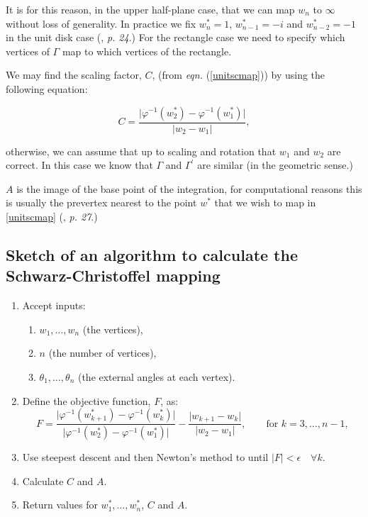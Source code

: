 \documentclass[a4paper,10pt]{amsart}
\newcommand{\sch}{Schwarz-Christoffel }
\newcommand{\eqn}[1]{\emph{eqn.} (\ref{#1})}
\newcommand{\phiinv}{\phi^{-1}}
\renewcommand{\phi}{\varphi}
\begin{document}
It is for this reason, in the upper half-plane case, that we can map $w_n$ to $\infty$ without loss of generality. In practice we fix $w^*_n=1$, $w^*_{n-1}=-i$ and $w^*_{n-2}=-1$ in the unit disk case (\cite{driscoll}, \emph{p. 24}.) For the rectangle case we need to specify which vertices of $\Gamma$ map to which vertices of the rectangle.

We may find the scaling factor, $C$, (from \eqn{unitscmap}) by using the following equation:

\begin{equation}
C=\frac{\vert \phiinv(w^*_2)-\phiinv(w^*_1)\vert}{\vert w_2 - w_1\vert},
\end{equation}

otherwise, we can assume that up to scaling and rotation that $w_1$ and $w_2$ are correct. In this case we know that $\Gamma$ and $\Gamma^\prime$ are similar (in the geometric sense.) 

$A$ is the image of the base point of the integration, for computational reasons this is usually the prevertex nearest to the point $w^*$ that we wish to map in \ref{unitscmap}  (\cite{driscoll}, \emph{p. 27}.)


\subsection{Sketch of an algorithm to calculate the \sch mapping}

\begin{enumerate}
\item Accept inputs:
   \begin{enumerate} 
      \item $w_1,\dots,w_n$ (the vertices),
      \item $n$ (the number of vertices),
      \item $\theta_1,\dots,\theta_n$ (the external angles at each vertex).
   \end{enumerate}
\item Define the objective function, $F$, as:
 \begin{equation*}
F=\frac{\vert \phi^{-1}(w^*_{k+1}) -  \phi^{-1}(w^*_k) \vert}{\vert \phi^{-1}(w^*_2)-\phi^{-1}(w^*_1)\vert} - \frac{\vert w_{k+1} - w_k\vert}{\vert w_2 - w_1\vert}, \qquad \text{for } k=3,\dots,n-1,
 \end{equation*}
\item Use steepest descent and then Newton's method to until $\vert F\vert < \epsilon \quad \forall k$. \item Calculate $C$ and $A$.
\item Return values for $w^*_1,\dots,w^*_n$, $C$ and $A$.
\end{enumerate}
\end{document}
